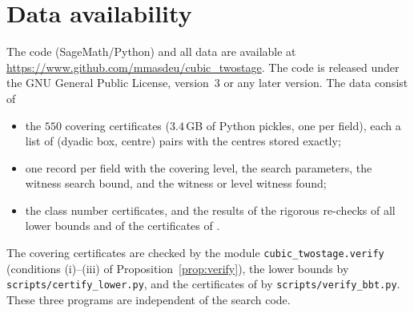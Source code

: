 \documentclass[11pt]{amsart}
\theoremstyle{definition}
\theoremstyle{remark}
\numberwithin{equation}{section}
\begin{document}
\section*{Data availability}
The code (SageMath/Python) and all data are available at
\url{https://www.github.com/mmasdeu/cubic_twostage}.
The code is released under the GNU General Public License, version~3 or any later version.
The data consist of
\begin{itemize}
\item the $550$ covering certificates ($3.4$\,GB of Python pickles, one per field), each a list
of (dyadic box, centre) pairs with the centres stored exactly;
\item one record per field with the covering level, the search parameters, the witness search
bound, and the witness or level witness found;
\item the class number certificates, and the results of the rigorous re-checks of all lower
bounds and of the certificates of \cite{BBT}.
\end{itemize}
The covering certificates are checked by the module \texttt{cubic\_twostage.verify}
(conditions (i)--(iii) of Proposition~\ref{prop:verify}), the lower bounds by
\texttt{scripts/certify\_lower.py}, and the certificates of \cite{BBT} by
\texttt{scripts/verify\_bbt.py}. These three programs are independent of the search code.
\end{document}
